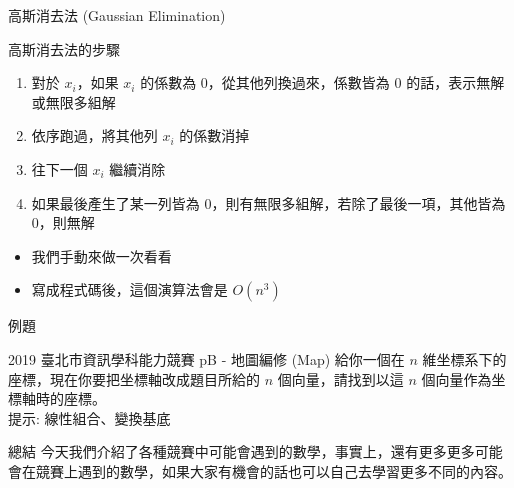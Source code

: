 \documentclass[aspectratio=169]{beamer}
\begin{document}
\begin{frame}{高斯消去法 (Gaussian Elimination)}
    \begin{block}{高斯消去法的步驟}
        \begin{enumerate}
            \item 對於 $x_i$，如果 $x_i$ 的係數為 $0$，從其他列換過來，係數皆為 $0$ 的話，表示無解或無限多組解
            \item 依序跑過，將其他列 $x_i$ 的係數消掉
            \item 往下一個 $x_i$ 繼續消除
            \item 如果最後產生了某一列皆為 $0$，則有無限多組解，若除了最後一項，其他皆為 $0$，則無解
        \end{enumerate}
    \end{block}
    \begin{itemize}
        \item 我們手動來做一次看看
        \item 寫成程式碼後，這個演算法會是 $O(n^3)$
    \end{itemize}
\end{frame}

\begin{frame}{例題}
    \begin{block}{2019 臺北市資訊學科能力競賽 pB - 地圖編修 (Map)}
        給你一個在 $n$ 維坐標系下的座標，現在你要把坐標軸改成題目所給的 $n$ 個向量，請找到以這 $n$ 個向量作為坐標軸時的座標。 \\
        \vspace{5mm}
        提示: 線性組合、變換基底
    \end{block}
\end{frame}

\begin{frame}{總結}
    今天我們介紹了各種競賽中可能會遇到的數學，事實上，還有更多更多可能會在競賽上遇到的數學，如果大家有機會的話也可以自己去學習更多不同的內容。
\end{frame}
\end{document}
